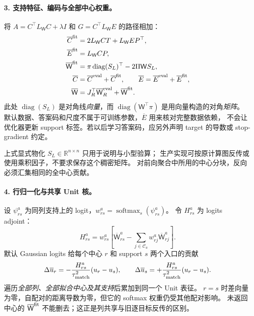\documentclass[11pt,UTF8,fontset=fandol]{ctexart}
\numberwithin{equation}{section}
\theoremstyle{definition}
\newcommand{\R}{\mathbb R}
\begin{document}
\paragraph{3. 支持特征、编码与全部中心权重。}
将 $A=C^\top L_{\mathsf W}C+\lambda I$ 和 $G=C^\top L_{\mathsf W}E$ 的路径相加：
\begin{equation}
 \begin{aligned}
 \overline C^{\rm fit}&=2L_{\mathsf W}CT+L_{\mathsf W}EP^\top,\\
 \overline E^{\rm fit}&=L_{\mathsf W}CP,\\
 \overline{\mathsf W}^{\rm fit}
 &=\pi\operatorname{diag}(S_L)^\top-2\Pi\mathsf W S_L,\\
 \overline C&=\overline C^{\rm eval}+\overline C^{\rm fit},\qquad
 \overline E=\overline E^{\rm eval}+\overline E^{\rm fit},\\
 \overline{\mathsf W}&=J_R^\top\overline{\mathsf W}_R^{\rm eval}
                       +\overline{\mathsf W}^{\rm fit}.
 \end{aligned}
 \label{v53:eq:reverse-moments}
\end{equation}
此处 $\operatorname{diag}(S_L)$ 是对角线\emph{向量}，而
$\operatorname{diag}(\mathsf W^\top\pi)$ 是用向量构造的对角\emph{矩阵}。
默认数据、答案码和尺度不属于可训练参数，$\overline E$ 用来核对完整数据依赖，
不会让优化器更新 support 标签。若以后学习答案码，应另外声明 target 的导数或 stop-gradient 约定。

上式显式物化 $S_L\in\R^{n\times n}$ 只用于说明与小型验算；
生产实现可按原计算图反传或使用乘积因子，不要求保存这个稠密矩阵。
对前向聚合中所用的中心分块，反向必须汇集相同的全中心贡献。

\paragraph{4. 行归一化与共享 Unit 核。}
设 $\psi_{rs}^a$ 为同列支持上的 logit，$w_{rs}^a=\operatorname{softmax}_s(\psi_{rs}^a)$。
令 $H_{rs}^a$ 为 logits adjoint：
\begin{equation}
 H_{rs}^a=w_{rs}^a\left[
 \overline{\mathsf W}_{rs}^a-
 \sum_{j\in\mathcal C_a}w_{rj}^a\overline{\mathsf W}_{rj}^a\right].
 \label{v53:eq:reverse-softmax}
\end{equation}
默认 Gaussian logits 给每个中心 $r$ 和 support $s$ 两个入口的贡献
\begin{equation}
 \Delta\overline u_r=-\frac{H_{rs}^a}{\tau_{\rm match}^2}(u_r-u_s),\qquad
 \Delta\overline u_s=+\frac{H_{rs}^a}{\tau_{\rm match}^2}(u_r-u_s).
 \label{v53:eq:reverse-unit}
\end{equation}
遍历\emph{全部列、全部拟合中心及其支持}后累加到同一个 Unit 表征。
$r=s$ 时差向量为零，自配对的距离导数为零，但它的 softmax 权重仍受其他配对影响。
未返回中心的 $\overline{\mathsf W}^{\rm fit}$ 不能删去；这正是列共享与旧逐目标反传的区别。
\end{document}
